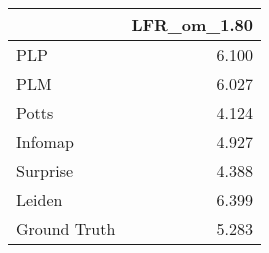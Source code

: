 \begin{tabular}{lr}
\toprule
{} & LFR_om_1.80 \\
\midrule
PLP          &       6.100 \\
PLM          &       6.027 \\
Potts        &       4.124 \\
Infomap      &       4.927 \\
Surprise     &       4.388 \\
Leiden       &       6.399 \\
Ground Truth &       5.283 \\
\bottomrule
\end{tabular}
